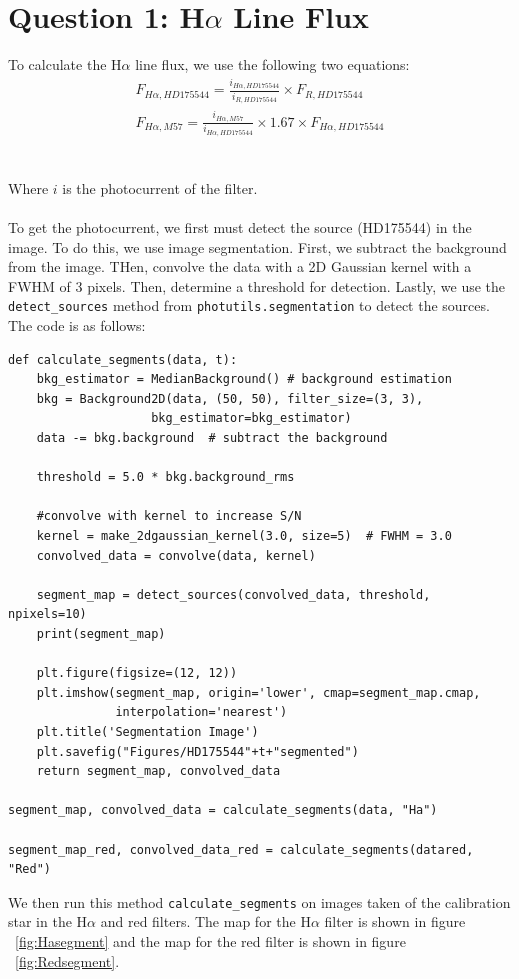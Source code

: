 \documentclass{article}
\begin{document}
\section{Question 1: H$\alpha$ Line Flux}
To calculate the H$\alpha$ line flux, we use the following two equations:
\begin{align}
F_{H\alpha, HD175544} = \frac{i_{{H\alpha, HD175544}}}{i_{R, HD175544}} \times F_{R, HD175544} \\
F_{H\alpha, M57} = \frac{i_{H\alpha, M57}}{i_{H\alpha, HD175544}} \times 1.67 \times F_{H\alpha, HD175544}
\end{align}
\\
\\
Where $i$ is the photocurrent of the filter. 
\\
\\
To get the photocurrent, we first must detect the source (HD175544) in the image. To do this, we use image segmentation. First, we subtract the background from the image. THen, convolve the data with a 2D Gaussian kernel with a FWHM of 3 pixels. Then, determine a threshold for detection. Lastly, we use the \verb|detect_sources| method from \verb|photutils.segmentation| to detect the sources. The code is as follows:
\begin{verbatim}
def calculate_segments(data, t):
    bkg_estimator = MedianBackground() # background estimation
    bkg = Background2D(data, (50, 50), filter_size=(3, 3),
                    bkg_estimator=bkg_estimator)
    data -= bkg.background  # subtract the background
    
    threshold = 5.0 * bkg.background_rms
    
    #convolve with kernel to increase S/N 
    kernel = make_2dgaussian_kernel(3.0, size=5)  # FWHM = 3.0
    convolved_data = convolve(data, kernel)
    
    segment_map = detect_sources(convolved_data, threshold, npixels=10) 
    print(segment_map)
    
    plt.figure(figsize=(12, 12))
    plt.imshow(segment_map, origin='lower', cmap=segment_map.cmap,
               interpolation='nearest')
    plt.title('Segmentation Image')
    plt.savefig("Figures/HD175544"+t+"segmented")
    return segment_map, convolved_data

segment_map, convolved_data = calculate_segments(data, "Ha")

segment_map_red, convolved_data_red = calculate_segments(datared, "Red")
\end{verbatim}
We then run this method \verb|calculate_segments| on images taken of the calibration star in the H$\alpha$ and red filters. The map for the H$\alpha$ filter is shown in figure ~\ref{fig:Hasegment} and the map for the red filter is shown in figure ~\ref{fig:Redsegment}.
\end{document}
